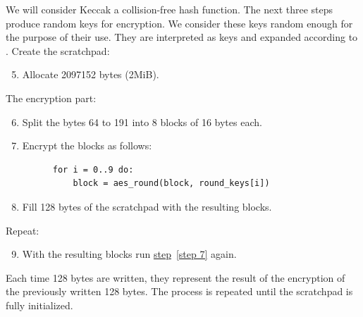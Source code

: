 We will consider Keccak a collision-free hash function. The next three steps produce random keys for encryption. We consider these keys random enough for the purpose of their use. They are interpreted as keys and expanded according to \cite{nla.cat-vn4183631}. Create the scratchpad:
\begin{enumerate}
  \setcounter{enumi}{4}
  \item Allocate 2097152 bytes (2MiB).
\end{enumerate}
The encryption part:
\begin{enumerate}
  \setcounter{enumi}{5}
  \item Split the bytes 64 to 191 into 8 blocks of 16 bytes each.
  \item \label{step 7} Encrypt the blocks as follows:
    \begin{verbatim}
      for i = 0..9 do:
          block = aes_round(block, round_keys[i])
    \end{verbatim}
\end{enumerate}
\begin{enumerate}
  \setcounter{enumi}{7}
  \item Fill 128 bytes of the scratchpad with the resulting blocks.
\end{enumerate}
Repeat:
\begin{enumerate}
  \setcounter{enumi}{8}
  \item With the resulting blocks run \hyperref[step 7]{step}~\ref{step 7} again.
\end{enumerate}

Each time 128 bytes are written, they represent the result of the encryption of the previously written 128 bytes. The process is repeated until the scratchpad is fully initialized.
\clearpage

